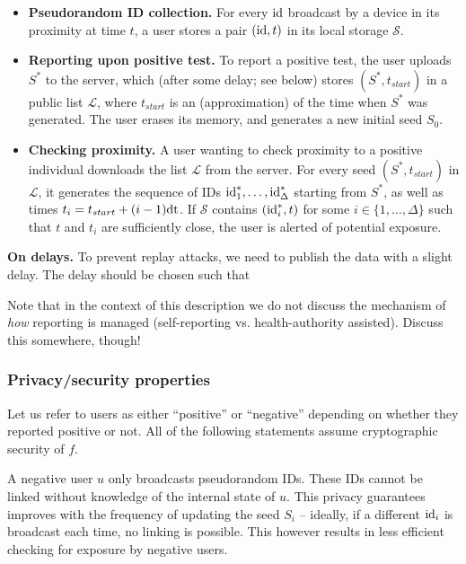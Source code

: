 \documentclass{article}
\newcommand{\TODO}[1]{ {\color{blue} #1 }}
\begin{document}
\begin{itemize}
\item {\bf Pseudorandom ID collection.} For every $\mathrm{id}$ broadcast by a device in its proximity at time $t$, a user stores a pair $(\mathrm{id}, t)$ in its local storage $\mathcal{S}$.
\item {\bf Reporting upon positive test.} To report a positive test, the user uploads $S^*$ to the server, which (after some delay; see below) stores $(S^*, t_{start})$ in a public list $\mathcal{L}$, where $t_{start}$ is an (approximation) of the time when $S^*$ was generated. The user erases its memory, and generates a new initial seed $S_0$. 
\item {\bf Checking proximity.} A user wanting to check proximity to a positive individual downloads the list $\mathcal{L}$ from the server. For every seed $(S^*,t_{start})$ in $\mathcal{L}$, it generates the sequence of IDs $\mathrm{id}^*_1, \ldots, \mathrm{id}^*_{\Delta}$ starting from $S^*$, as well as times $t_i = t_{start} + (i-1) \mathrm{dt}$. If $\mathcal{S}$ contains $(\mathrm{id}_i^*, t)$ for some $i \in \{1, \ldots, \Delta\}$ such that $t$ and $t_i$ are sufficiently close, the user is alerted of potential exposure.
\end{itemize}
{\bf On delays.} To prevent replay attacks, we need to publish the data with a slight delay. The delay should be chosen such that  

Note that in the context of this description we do not discuss the mechanism of {\em how} reporting is managed (self-reporting vs. health-authority assisted).  \TODO{Discuss this somewhere, though!}





\subsubsection{Privacy/security properties}

Let us refer to users as either ``positive'' or ``negative'' depending on whether they reported positive or not. All of the following statements assume cryptographic security of $f$.

  A negative user $u$ only broadcasts pseudorandom IDs. These IDs cannot be linked without knowledge of the internal state of $u$. This privacy guarantees improves with the frequency of updating the seed $S_i$ -- ideally, if a different $\mathrm{id}_i$ is broadcast each time, no linking is possible. This however results in less efficient checking for exposure by negative users.
\smallskip
\end{document}
